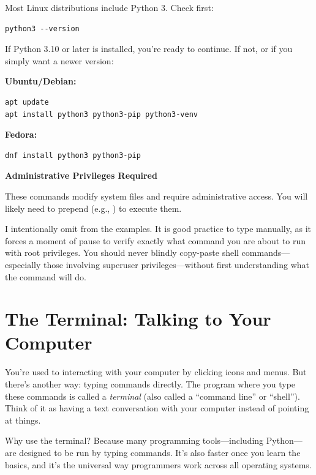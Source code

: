 Most Linux distributions include Python 3. Check first:

\begin{lstlisting}[style=shellstyle]
python3 --version
\end{lstlisting}

If Python 3.10 or later is installed, you're ready to continue. If not, or if you simply want a newer version:

\textbf{Ubuntu/Debian:}
\begin{lstlisting}[style=shellstyle]
apt update
apt install python3 python3-pip python3-venv
\end{lstlisting}

\textbf{Fedora:}
\begin{lstlisting}[style=shellstyle]
dnf install python3 python3-pip
\end{lstlisting}

\begin{note}
\textbf{Administrative Privileges Required}

These commands modify system files and require administrative access. You will likely need to prepend  (e.g., ) to execute them.

I intentionally omit  from the examples. It is good practice to type  manually, as it forces a moment of pause to verify exactly what command you are about to run with root privileges. You should never blindly copy-paste shell commands---especially those involving superuser privileges---without first understanding what the command will do.
\end{note}

\section{The Terminal: Talking to Your Computer}
\label{sec:launcher}

You're used to interacting with your computer by clicking icons and menus. But there's another way: typing commands directly. The program where you type these commands is called a \emph{terminal} (also called a ``command line'' or ``shell''). Think of it as having a text conversation with your computer instead of pointing at things.

Why use the terminal? Because many programming tools---including Python---are designed to be run by typing commands. It's also faster once you learn the basics, and it's the universal way programmers work across all operating systems.

